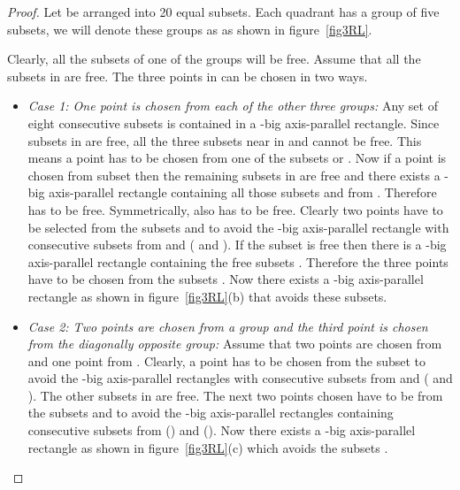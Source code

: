 \begin{proof}
Let  be arranged into 20 equal subsets. Each quadrant has a group of five subsets, we will denote these groups as 
 as shown in figure~\ref{fig3RL}.



Clearly, all the subsets of one of the groups will be free. Assume that all the subsets
in  are free. The three points in  can be chosen in two ways.
\begin{itemize}
 \item \emph{Case 1: One point is chosen from each of the other three groups:}
Any set of eight consecutive subsets is contained in a -big axis-parallel
rectangle. Since subsets in  are free, all the three subsets near  in  and 
cannot be free. This means a point has to be chosen from one of the subsets
 or . Now if a
point is chosen from subset  then the remaining subsets in  are free and there exists
a -big axis-parallel rectangle containing all those subsets and  from .
Therefore  has to be free. Symmetrically,  also has to be free. Clearly two points have to be selected from the subsets  and 
to avoid the -big axis-parallel
rectangle with consecutive subsets from  and  ( and ). If the subset  is free then there is a -big axis-parallel rectangle containing the free subsets 
.
 Therefore the three points have to be chosen from the subsets
. Now there exists a -big axis-parallel rectangle as shown in figure~\ref{fig3RL}(b) that avoids these subsets.
\item \emph{Case 2: Two points are chosen from a group and the third point is chosen
from the diagonally opposite group:}
Assume that two points are chosen from 
and one point from . Clearly, a point has to be chosen from the subset  to avoid the -big
axis-parallel rectangles with consecutive subsets from  and  ( and ).
 The other subsets in  are free. The next two points
chosen have to be from the subsets  and  to avoid the -big axis-parallel
rectangles containing consecutive subsets from  () and  (). Now
there exists a -big axis-parallel rectangle as shown in figure~\ref{fig3RL}(c)
which avoids the subsets .
\end{itemize}

\end{proof}

\begin{lem}\label{lemma4RL}
 
\end{lem}

